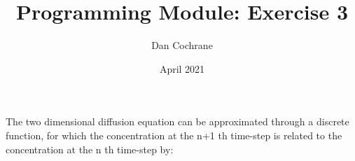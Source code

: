 \documentclass{article}
\title{Programming Module: Exercise 3}
\author{Dan Cochrane}
\date{April 2021}
\begin{document}
\maketitle
The two dimensional diffusion equation can be approximated through a discrete function, for which the concentration at the n+1 th time-step is related to the concentration at the n th time-step by:
\end{document}
